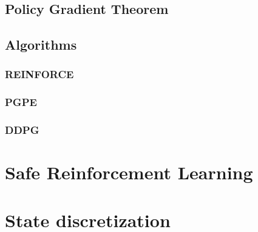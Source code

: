 \subsection{Policy Gradient Theorem}

\subsection{Algorithms}
\subsubsection{REINFORCE}
\subsubsection{PGPE}
\subsubsection{DDPG}

\section{Safe Reinforcement Learning}

\section{State discretization}